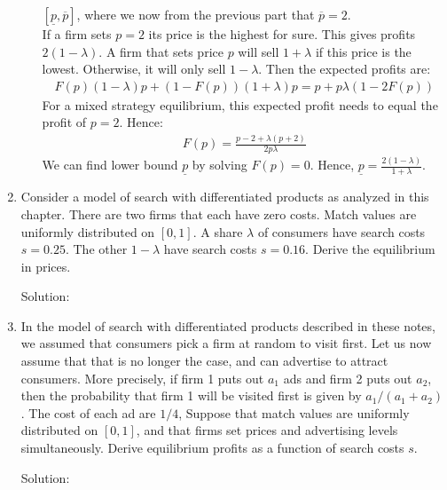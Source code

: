 \begin{enumerate}
\begin{enumerate}
		            $[\underline{p},\overline{p}]$, where we now from the previous part that $\overline{p}=2$.\\
		            If a firm sets $p=2$ its price is the highest for sure. This gives profits $2(1-\lambda )$.
		            A firm that sets price $p$ will sell $1+\lambda$ if this price is the lowest. Otherwise, it will only
		            sell $1-\lambda$. Then the expected profits are:
		            \begin{align*}
			            F(p)(1-\lambda)p+(1-F(p))(1+\lambda)p=p+p\lambda(1-2F(p))
		            \end{align*}
		            For a mixed strategy equilibrium, this expected profit needs to equal the profit of $p=2$. Hence:
		            \begin{align*}
			            F(p)=\frac{p-2+\lambda(p+2)}{2p\lambda}
		            \end{align*}
		            We can find lower bound $\underline{p}$ by solving $F(p)=0$.
		            Hence, $\underline p = \frac{2(1-\lambda)}{1+\lambda}$.
	      \end{enumerate}
	\item Consider a model of search with differentiated products as analyzed in this chapter.
	      There are two firms that each have zero costs. Match values are uniformly
	      distributed on $[0, 1]$. A share $\lambda$ of consumers have search costs $s = 0.25$. The other
	      $1-\lambda$ have search costs $s=0.16$. Derive the equilibrium in prices.

	      Solution:
	\item In the model of search with differentiated products described in these notes, we
	      assumed that consumers pick a firm at random to visit first. Let us now assume that
	      that is no longer the case, and can advertise to attract consumers. More precisely,
	      if firm 1 puts out $a_1$ ads and firm 2 puts out $a_2$, then the probability that firm 1
	      will be visited first is given by $a_1/(a_1 + a_2)$. The cost of each ad are $1/4$,
	      Suppose that match values are uniformly distributed on $[0,1]$, and that firms set
	      prices and advertising levels simultaneously. Derive equilibrium profits as a function
	      of search costs $s$.

	      Solution:
\end{enumerate}

